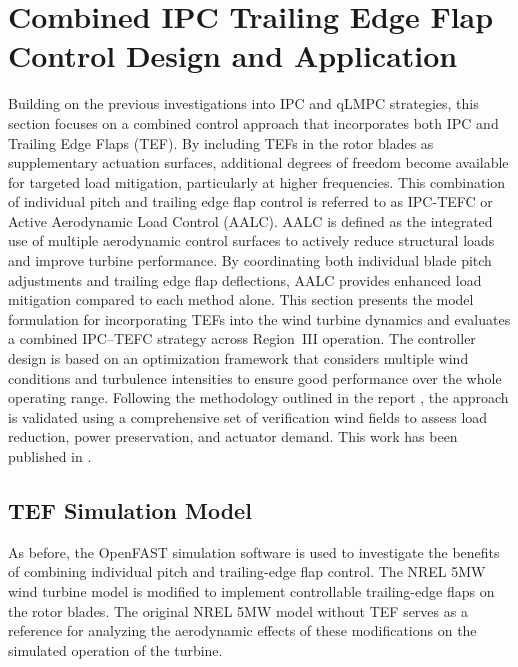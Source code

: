 \let\oldsectionmark\sectionmark
\renewcommand{\sectionmark}[1]{\oldsectionmark{Combined IPC-TEFC Design and Application}}
\section{Combined IPC Trailing Edge Flap Control Design and Application}
\label{sec:CombinedIPC-TrailingEdgeFlapControl}
\let\sectionmark\oldsectionmark

Building on the previous investigations into IPC and qLMPC strategies, this section focuses on a combined control approach that incorporates both IPC and Trailing Edge Flaps (TEF). By including TEFs in the rotor blades as supplementary actuation surfaces, additional degrees of freedom become available for targeted load mitigation, particularly at higher frequencies. This combination of individual pitch and trailing edge flap control is referred to as IPC-TEFC or Active Aerodynamic Load Control (AALC). AALC is defined as the integrated use of multiple aerodynamic control surfaces to actively reduce structural loads and improve turbine performance. By coordinating both individual blade pitch adjustments and trailing edge flap deflections, AALC provides enhanced load mitigation compared to each method alone. This section presents the model formulation for incorporating TEFs into the wind turbine dynamics and evaluates a combined IPC–TEFC strategy across Region~III operation. The controller design is based on an optimization framework that considers multiple wind conditions and turbulence intensities to ensure good performance over the whole operating range. Following the methodology outlined in the report \cite{osterwinter2019load1}, the approach is validated using a comprehensive set of verification wind fields to assess load reduction, power preservation, and actuator demand. This work has been published in \cite{dittmer2024combined}.


\subsection{TEF Simulation Model} %
As before, the OpenFAST simulation software is used to investigate the benefits of combining individual pitch and trailing-edge flap control. The NREL 5MW wind turbine model is modified to implement controllable trailing-edge flaps on the rotor blades. The original NREL 5MW model without TEF serves as a reference for analyzing the aerodynamic effects of these modifications on the simulated operation of the turbine. 
